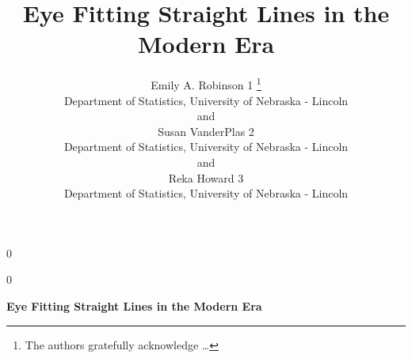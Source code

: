 \documentclass[12pt]{article}
\newcommand{\blind}{0}
\begin{document}
\def\spacingset#1{\renewcommand{\baselinestretch}%
{#1}\small\normalsize} \spacingset{1}



\blind
{
  \title{\bf Eye Fitting Straight Lines in the Modern Era}

  \author{
        Emily A. Robinson 1 \thanks{The authors gratefully acknowledge
\ldots{}} \\
    Department of Statistics, University of Nebraska - Lincoln\\
     and \\     Susan VanderPlas 2 \\
    Department of Statistics, University of Nebraska - Lincoln\\
     and \\     Reka Howard 3 \\
    Department of Statistics, University of Nebraska - Lincoln\\
      }
  \maketitle
} \fi

\blind
{
  \bigskip
  \bigskip
  \bigskip
  \begin{center}
    {\LARGE\bf Eye Fitting Straight Lines in the Modern Era}
  \end{center}
  \medskip
} \fi
\end{document}
